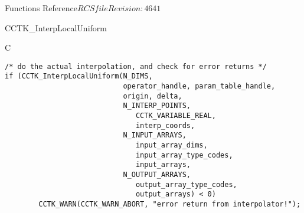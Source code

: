 \begin{cactuspart}{ Functions Reference}{$RCSfile$}{$Revision: 4641 $}
\begin{FunctionDescription}{CCTK\_InterpLocalUniform}
\begin{ExampleSection}
\begin{Example}{C}
\begin{verbatim}
/* do the actual interpolation, and check for error returns */
if (CCTK_InterpLocalUniform(N_DIMS,
                            operator_handle, param_table_handle,
                            origin, delta,
                            N_INTERP_POINTS,
                               CCTK_VARIABLE_REAL,
                               interp_coords,
                            N_INPUT_ARRAYS,
                               input_array_dims,
                               input_array_type_codes,
                               input_arrays,
                            N_OUTPUT_ARRAYS,
                               output_array_type_codes,
                               output_arrays) < 0)
        CCTK_WARN(CCTK_WARN_ABORT, "error return from interpolator!");
\end{verbatim}
\end{Example}
\end{ExampleSection}
\end{FunctionDescription}



\end{cactuspart}
